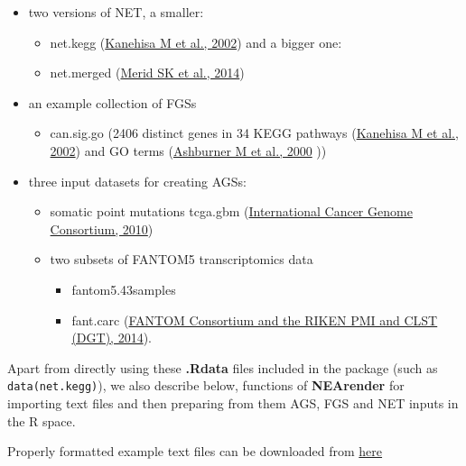 \documentclass[]{article}
\providecommand{\tightlist}{%
  \setlength{\itemsep}{0pt}\setlength{\parskip}{0pt}}
\begin{document}
\begin{itemize}
\tightlist
\item
  two versions of NET, a smaller:

  \begin{itemize}
  \tightlist
  \item
    net.kegg
    (\href{http://www.ncbi.nlm.nih.gov/pubmed/11752249}{Kanehisa M et
    al., 2002}) and a bigger one:
  \item
    net.merged (\href{http://www.ncbi.nlm.nih.gov/pubmed/25236784}{Merid
    SK et al., 2014})
  \end{itemize}
\item
  an example collection of FGSs

  \begin{itemize}
  \tightlist
  \item
    can.sig.go (2406 distinct genes in 34 KEGG pathways
    (\href{http://www.ncbi.nlm.nih.gov/pubmed/11752249}{Kanehisa M et
    al., 2002}) and GO terms
    (\href{http://www.ncbi.nlm.nih.gov/pubmed/10802651}{Ashburner M et
    al., 2000} ))
  \end{itemize}
\item
  three input datasets for creating AGSs:

  \begin{itemize}
  \tightlist
  \item
    somatic point mutations tcga.gbm
    (\href{http://www.ncbi.nlm.nih.gov/pubmed/20393554}{International
    Cancer Genome Consortium, 2010})
  \item
    two subsets of FANTOM5 transcriptomics data

    \begin{itemize}
    \tightlist
    \item
      fantom5.43samples
    \item
      fant.carc
      (\href{http://www.ncbi.nlm.nih.gov/pubmed/24670764}{FANTOM
      Consortium and the RIKEN PMI and CLST (DGT), 2014}).
    \end{itemize}
  \end{itemize}
\end{itemize}

Apart from directly using these \textbf{.Rdata} files included in the
package (such as \texttt{data(net.kegg)}), we also describe below,
functions of \textbf{NEArender} for importing text files and then
preparing from them AGS, FGS and NET inputs in the R space.

Properly formatted example text files can be downloaded from
\href{http://research.scilifelab.se/andrej_alexeyenko/downloads/test_data/}{here}
\end{document}
